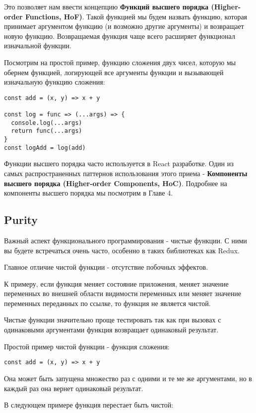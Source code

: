 Это позволяет нам ввести концепцию \textbf{Функций высшего порядка (Higher-order Functions, HoF)}. Такой функцией мы будем назвать функцию, которая принимает аргументом функцию (и возможно другие аргументы) и возвращает новую функцию. Возвращаемая функция чаще всего расширяет функционал изначальной функции.

Посмотрим на простой пример, функцию сложения двух чисел, которую мы обернем функцией, логирующей все аргументы функции и вызывающей изначальную функцию сложения:

\begin{lstlisting}
const add = (x, y) => x + y

const log = func => (...args) => {
  console.log(...args)
  return func(...args)
}
const logAdd = log(add)
\end{lstlisting}

Функции высшего порядка часто используется в React разработке. Один из самых распространенных паттернов использования этого приема - \textbf{Компоненты высшего порядка (Higher-order Components, HoC)}. Подробнее на компоненты высшего порядка мы посмотрим в Главе 4.

\subsection{Purity}

Важный аспект функционального программирования - чистые функции. С ними вы будете встречаться очень часто, особенно в таких библиотеках как Redux.

Главное отличие чистой функции - отсутствие побочных эффектов.

К примеру, если функция меняет состояние приложения, меняет значение переменных во внешней области видимости переменных или меняет значение переменных переданных по ссылке, то функция не является чистой.

Чистые функции значительно проще тестировать так как при вызовах с одинаковыми аргументами функция возвращает одинаковый результат.

Простой пример чистой функции - функция сложения:

\begin{lstlisting}
const add = (x, y) => x + y 
\end{lstlisting}

Она может быть запущена множество раз с одними и те ме же аргументами, но в каждый раз она вернет одинаковый результат. 

В следующем примере функция перестает быть чистой:

